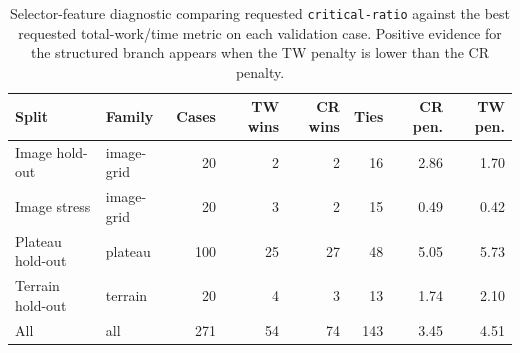 \begin{table}[ht]
\centering
\small
\begin{tabular}{llrrrrrr}
\toprule
Split & Family & Cases & TW wins & CR wins & Ties & CR pen. & TW pen. \\
\midrule
Image hold-out & image-grid & 20 & 2 & 2 & 16 & 2.86 & 1.70 \\
Image stress & image-grid & 20 & 3 & 2 & 15 & 0.49 & 0.42 \\
Plateau hold-out & plateau & 100 & 25 & 27 & 48 & 5.05 & 5.73 \\
Terrain hold-out & terrain & 20 & 4 & 3 & 13 & 1.74 & 2.10 \\
All & all & 271 & 54 & 74 & 143 & 3.45 & 4.51 \\
\bottomrule
\end{tabular}
\caption{Selector-feature diagnostic comparing requested \texttt{critical-ratio} against the best requested total-work/time metric on each validation case.  Positive evidence for the structured branch appears when the TW penalty is lower than the CR penalty.}
\label{tab:selector-feature-diagnostic}
\end{table}

